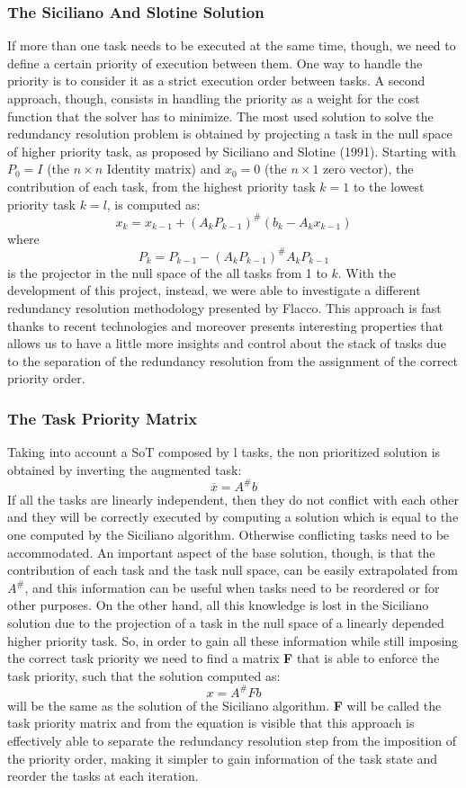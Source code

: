 \documentclass[12pt, a4paper]{article}
\begin{document}
\subsubsection{The Siciliano And Slotine Solution}

If more than one task needs to be executed at the same time, though, we need to define a certain priority of execution between them. One way to handle the priority is  to consider it as a strict execution order between tasks. A second approach, though, consists in handling the priority as a weight for the cost function that the solver has to minimize.
The most used solution to solve the redundancy resolution problem is obtained by projecting a task in the null space of higher priority task, as proposed by Siciliano and Slotine (1991). Starting with $P_0 = I$ (the $n \times n$ Identity matrix) and $x_0 = 0$ (the $n \times 1$ zero vector), the contribution of each task, from the highest priority task $k = 1$ to the lowest priority task $k = l$, is computed as:
\[
x_k = x_{k-1} + (A_kP_{k-1})^{\#}(b_k - A_kx_{k-1})
\]where \[
P_k = P_{k-1}-(A_kP_{k-1})^{\#}A_kP_{k-1}
\]
is the projector in the null space of the all tasks from 1 to $k$.
With the development of this project, instead, we were able to investigate a different redundancy resolution methodology presented by Flacco. This approach is fast thanks to recent technologies and moreover presents interesting properties that allows us to have a little more insights and control about the stack of tasks due to the separation of the redundancy resolution from the assignment of the correct priority order. 
\subsubsection{The Task Priority Matrix}

Taking into account a SoT composed by l tasks, the non prioritized solution is obtained by inverting the augmented task:
\[
\overline{x} = A^\#b\]
If all the tasks are linearly independent, then they do not conflict with each other and they will be correctly executed by computing a solution which is equal to the one computed by the Siciliano algorithm. Otherwise conflicting tasks need to be accommodated.
An important aspect of the base solution, though, is that the contribution of each task and the task null space, can be easily extrapolated from $A^\#$, and this information can be useful when tasks need to be reordered or for other purposes. On the other hand, all this knowledge is lost in the Siciliano solution due to the projection of a task in the null space of a linearly depended higher priority task. 
So, in order to gain all these information while still imposing the correct task priority we need to find a matrix \textbf{F} that is able to enforce the task priority, such that the solution computed as: \[x = A^\#Fb\]
will be the same as the solution of the Siciliano algorithm.
\textbf{F} will be called the task priority matrix and from the equation is visible that this approach is effectively able to separate the redundancy resolution step from the imposition of the priority order, making it simpler to gain information of the task state and reorder the tasks at each iteration.
\end{document}
